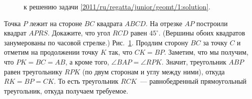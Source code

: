 \ifsolution
\begin{figure}\centering
    \caption{к решению задачи \ref{2011/ru/regatta/junior/geomt/1:solution}.}
    \label{2011/ru/regatta/junior/geomt/1:solution:fig}
\end{figure}%
\fi %

\problem
Точка $P$ лежит на стороне $BC$ квадрата $ABCD$.
На отрезке $AP$ построили квадрат $APRS$.
Докажите, что угол $RCD$ равен $45^\circ$.
(Вершины обоих квадратов занумерованы по часовой стрелке.)
\solution
\label{2011/ru/regatta/junior/geomt/1:solution}%
Рис.~\ref{2011/ru/regatta/junior/geomt/1:solution:fig}.
Продлим сторону $BC$ за точку $C$ и отметим на продолжении точку $K$ так, что
$C K = B P$.
Заметим, что мы получим, что $PK = BC = AB$, а кроме того,
$\angle BAP = \angle RPK$.
Значит, треугольник $ABP$ равен треугольнику $RPK$
(по двум сторонам и углу между ними),
откуда $RK = BP = CK$.
То есть треугольник $RCK$~--- равнобедренный прямоугольный треугольник, откуда
получаем требуемое.
\endproblem

